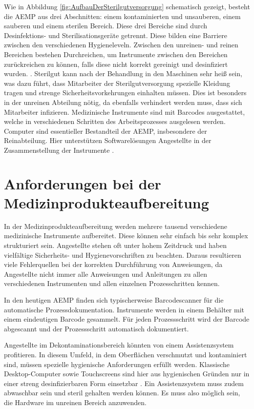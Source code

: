 Wie in Abbildung \ref{fig:AufbauDerSterilgutversorgung} schematisch gezeigt, besteht die AEMP aus drei Abschnitten: einem kontaminierten und unsauberen, einem sauberen und einem sterilen Bereich. Diese drei Bereiche sind durch Desinfektions- und Sterilisationsgeräte getrennt. Diese bilden eine Barriere zwischen den verschiedenen Hygieneleveln. Zwischen den unreinen- und reinen Bereichen bestehen Durchreichen, um Instrumente zwischen den Bereichen zurückreichen zu können, falls diese nicht korrekt gereinigt und desinfiziert wurden. \cite[S.~24]{Ruther2014}. Sterilgut kann nach der Behandlung in den Maschinen sehr heiß sein, was dazu führt, dass Mitarbeiter der Sterilgutversorgung spezielle Kleidung tragen und strenge Sicherheitsvorkehrungen einhalten müssen. Dies ist besonders in der unreinen Abteilung nötig, da ebenfalls verhindert werden muss, dass sich Mitarbeiter infizieren. Medizinische Instrumente sind mit Barcodes ausgestattet, welche in verschiedenen Schritten des Arbeitsprozesses ausgelesen werden. Computer sind essentieller Bestandteil der AEMP, insbesondere der Reinabteilung. Hier unterstützen Softwarelösungen Angestellte in der Zusammenstellung der Instrumente \cite[S.~25]{Ruther2014}.
%
%
%
%
%
%
\section{Anforderungen bei der Medizinprodukteaufbereitung}
\label{sec:Anforderungen_bei_der_Medizinprodukteaufbereitung}
In der Medizinprodukteaufbereitung werden mehrere tausend verschiedene medizinische Instrumente aufbereitet. Diese können sehr einfach bis sehr komplex strukturiert sein. Angestellte stehen oft unter hohem Zeitdruck und haben  vielfältige Sicherheits- und Hygienevorschriften zu beachten. Daraus resultieren viele Fehlerquellen bei der korrekten Durchführung von Anweisungen, da Angestellte nicht immer alle Anweisungen und Anleitungen zu allen verschiedenen Instrumenten und allen einzelnen Prozesschritten kennen.

In den heutigen AEMP finden sich typischerweise Barcodescanner für die automatische Prozessdokumentation. Instrumente werden in einem Behälter mit einem eindeutigen Barcode gesammelt. Für jeden Prozessschritt wird der Barcode abgescannt und der Prozessschritt automatisch dokumentiert.

Angestellte im Dekontaminationsbereich könnten von einem Assistenzsystem profitieren. 
In diesem Umfeld, in dem Oberflächen verschmutzt und kontaminiert sind, müssen spezielle hygienische Anforderungen erfüllt werden. Klassische Desktop-Computer sowie Touchscreens sind hier aus hygienischen Gründen nur in einer streng desinfizierbaren Form einsetzbar \cite[S.~28]{Ruther2014}. Ein Assistenzsystem muss zudem abwaschbar sein und steril gehalten werden können. Es muss also möglich sein, die Hardware im unreinen Bereich anzuwenden. 


